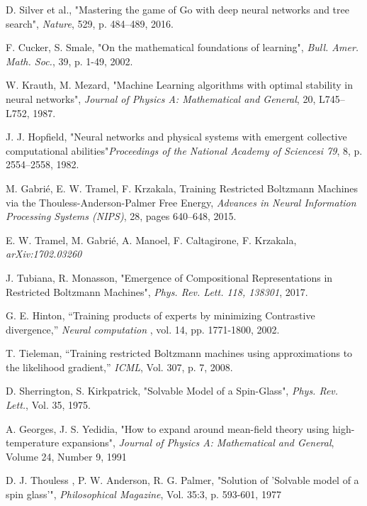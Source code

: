 \begin{thebibliography}{9}

D. Silver et al., "Mastering the game of Go with deep neural networks and tree search",
\textit{Nature}, 529, p. 484–489, 2016.

F. Cucker, S. Smale, "On the mathematical foundations of learning",
\textit{Bull. Amer. Math. Soc.}, 39, p. 1-49, 2002.

W. Krauth, M. Mezard, "Machine Learning algorithms with optimal stability in neural networks",
\textit{Journal of Physics A: Mathematical and General}, 20, L745–L752, 1987.

J. J. Hopfield, "Neural networks and physical systems with emergent collective computational abilities"\textit{Proceedings of the National Academy of Sciencesi 79}, 8, p. 2554–2558, 1982.

M. Gabri\'e, E. W. Tramel, F. Krzakala,
Training Restricted Boltzmann Machines via the Thouless-Anderson-Palmer Free Energy,
\textit{Advances in Neural Information Processing Systems (NIPS)}, 28, pages 640--648, 2015.

E. W. Tramel, M. Gabri\'e, A. Manoel, F. Caltagirone, F. Krzakala, \textit{arXiv:1702.03260}

J. Tubiana, R. Monasson, "Emergence of Compositional Representations in Restricted Boltzmann Machines",
\textit{Phys. Rev. Lett. 118, 138301}, 2017.

G. E. Hinton, “Training products of experts by minimizing Contrastive divergence,”
\textit{Neural computation}
, vol. 14, pp. 1771-1800, 2002.

T. Tieleman, “Training restricted Boltzmann machines using approximations to the likelihood gradient,”
\textit{ICML}, Vol. 307, p. 7, 2008.

D. Sherrington, S. Kirkpatrick,
"Solvable Model of a Spin-Glass",
\textit{Phys. Rev. Lett.}, Vol. 35, 1975.

A. Georges, J. S. Yedidia,
"How to expand around mean-field theory using high-temperature expansions",
\textit{Journal of Physics A: Mathematical and General}, Volume 24, Number 9, 1991

D. J. Thouless , P. W. Anderson, R. G. Palmer,
"Solution of 'Solvable model of a spin glass'",
\textit{Philosophical Magazine}, Vol. 35:3, p. 593-601, 1977


\end{thebibliography}
